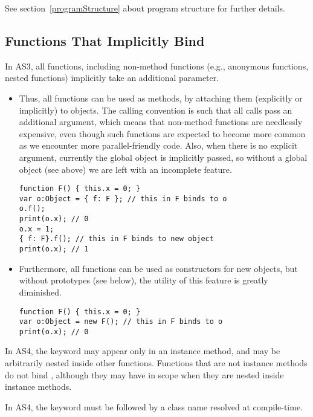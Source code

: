 See section~\ref{programStructure} about program structure for further
details.

\subsection{Functions That Implicitly Bind }

In AS3, all functions, including non-method functions (e.g., anonymous
functions, nested functions) implicitly take an additional  parameter.

\begin{itemize}
\item Thus, all functions can be used as methods, by attaching them
  (explicitly or implicitly) to objects. The
calling convention is such that all calls pass an additional 
argument, which means that non-method functions are needlessly expensive,
even though such functions are expected to become more common as we
encounter more parallel-friendly code. Also, when there is no explicit 
argument, currently the global object is
implicitly passed, so without a
global object (see above) we are left with an incomplete feature.

\begin{verbatim}
function F() { this.x = 0; }
var o:Object = { f: F }; // this in F binds to o
o.f();
print(o.x); // 0
o.x = 1;
{ f: F}.f(); // this in F binds to new object
print(o.x); // 1
\end{verbatim}

\item Furthermore, all functions can be used as constructors for new
objects, but without prototypes (see below), the utility of this
feature is greatly diminished.

\begin{verbatim}
function F() { this.x = 0; }
var o:Object = new F(); // this in F binds to o
print(o.x); // 0
\end{verbatim}

\end{itemize}

In AS4, the keyword  may appear only in an instance method,
and may be arbitrarily nested inside other functions. Functions that
are not instance methods do not bind , although they may
have  in scope when they are nested inside instance
methods.

In AS4, the keyword  must be followed by a class name
resolved at compile-time.

